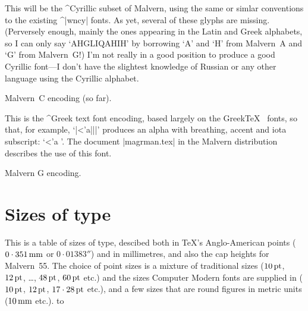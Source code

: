 
	This will be the ^{Cyrillic} subset of Malvern, using the same
	or simlar conventions to the existing ^|wncy| fonts.  As yet,
	several of these glyphs are missing.  (Perversely enough, mainly
	the ones appearing in the Latin and Greek alphabets, so I can
	only say `AH{\gr G}{\cy LIQ}AH{\cy I}H' by borrowing `A' and `H'
	from Malvern~A and `{\gr G}' from Malvern~G!)  I'm not really in
	a good position to produce a good Cyrillic font---I don't have
	the slightest knowledge of Russian or any other language using
	the Cyrillic alphabet.

\topinsert
	{\rmc \ntable}
\caption{Malvern~C encoding (so far).}
\endinsert

	

	This is the ^{Greek} text font encoding, based largely on the
	Greek\TeX\ \cite{KD} fonts, so that, for example, `|<'a|||'
	produces an alpha with breathing, accent and iota subscript:
	`{\gr <'a }'.  The document |magrman.tex| in the Malvern
	distribution describes the use of this font.

\topinsert
	{\gr \ntable}
\caption{Malvern G encoding.}
\endinsert

\dosupereject
\iflong
\vfil
{}
\vfilneg
\section{Sizes of type}

	This is a table of sizes of type, descibed both in \TeX's
	Anglo-American points ($0\cdot351\,{\rm mm}$ or $0\cdot01383''$)
	and in millimetres, and also the cap heights for Malvern~55.
	The choice of point sizes is a mixture of traditional sizes
	($10\,{\rm pt}$, $12\,{\rm pt}$, \dots, $48\,{\rm pt}$, $60\,{\rm pt}$ etc.) and the sizes
	Computer Modern fonts are supplied in ($10\,{\rm pt}$, $12\,{\rm pt}$,
	$17\cdot28\,{\rm pt}$ etc.), and a few sizes that are round figures in
	metric units ($10\,{\rm mm}$ etc.).
\medskip
\moveleft\leftmargin\vbox{\advance\hsize\leftmargin
\halign to }
\smallskip

